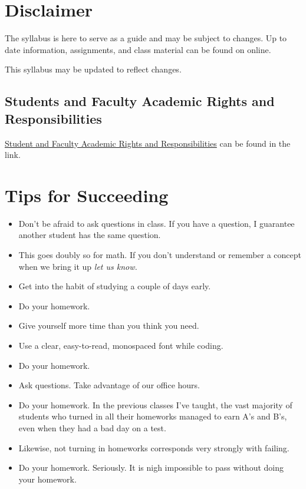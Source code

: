 \documentclass[10pt, letter]{article}
\begin{document}
\section{Disclaimer}
The syllabus is here to serve as a guide and may be subject to changes.  Up to date information, assignments, and class material can be found on online.

This syllabus may be updated to reflect changes.


\subsection*{Students and Faculty Academic Rights and Responsibilities}
\href{http://policies.temple.edu/PDF/99.pdf}{Student and Faculty Academic Rights and Responsibilities} can be found in the link.


\section{Tips for Succeeding}
\begin{itemize}
	\item Don't be afraid to ask questions in class.  If you have a question, I guarantee another student has the same question.  
	\item This goes doubly so for math.  If you don't understand or remember a concept when we bring it up \emph{let us know.}
	\item Get into the habit of studying a couple of days early.
	\item Do your homework.
	\item Give yourself more time than you think you need.
	\item Use a clear, easy-to-read, monospaced font while coding.
	\item Do your homework.
	\item Ask questions.  Take advantage of our office hours.
	\item Do your homework.  In the previous classes I've taught, the vast majority of students who turned in all their homeworks managed to earn A's and B's, even when they had a bad day on a test.
	\item Likewise, not turning in homeworks corresponds very strongly with failing.
	\item Do your homework. Seriously.  It is nigh impossible to pass without doing your homework.
	
	
\end{itemize}
\end{document}
